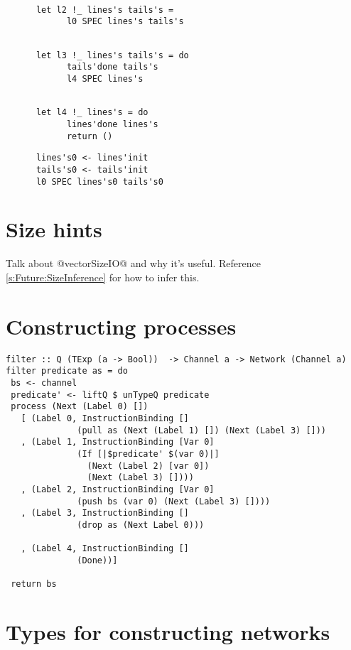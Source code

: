 \begin{lstlisting}

      let l2 !_ lines's tails's =
            l0 SPEC lines's tails's
\end{lstlisting}

\begin{lstlisting}

      let l3 !_ lines's tails's = do
            tails'done tails's
            l4 SPEC lines's
\end{lstlisting}

\begin{lstlisting}

      let l4 !_ lines's = do
            lines'done lines's
            return ()
\end{lstlisting}

\begin{lstlisting}
      lines's0 <- lines'init
      tails's0 <- tails'init
      l0 SPEC lines's0 tails's0
\end{lstlisting}

\section{Size hints}
\label{s:implementation:sizehints}
Talk about @vectorSizeIO@ and why it's useful.
Reference \autoref{s:Future:SizeInference} for how to infer this.

\section{Constructing processes}
\begin{lstlisting}
filter :: Q (TExp (a -> Bool))  -> Channel a -> Network (Channel a)
filter predicate as = do
 bs <- channel
 predicate' <- liftQ $ unTypeQ predicate
 process (Next (Label 0) [])
   [ (Label 0, InstructionBinding []
              (pull as (Next (Label 1) []) (Next (Label 3) []))
   , (Label 1, InstructionBinding [Var 0]
              (If [|$predicate' $(var 0)|]
                (Next (Label 2) [var 0])
                (Next (Label 3) [])))
   , (Label 2, InstructionBinding [Var 0]
              (push bs (var 0) (Next (Label 3) [])))
   , (Label 3, InstructionBinding []
              (drop as (Next Label 0)))

   , (Label 4, InstructionBinding []
              (Done))]

 return bs
\end{lstlisting}

\section{Types for constructing networks}

